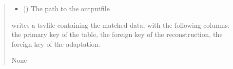 \documentclass[letterpaper,10pt,english]{sphinxmanual}
\begin{document}
\begin{fulllineitems}
\begin{quote}
\begin{description}
\begin{itemize}
\item {} 
\sphinxAtStartPar
{} () \textendash{} The path to the output\sphinxhyphen{}file

\end{itemize}

\sphinxAtStartPar
writes a tsv\sphinxhyphen{}file containing the matched data,
with the following columns:  \textendash{} the primary key of the
table,  \textendash{} the foreign key of the reconstruction,
 \textendash{} the foreign key of the adaptation.

\sphinxAtStartPar
None

\end{description}\end{quote}

\sphinxAtStartPar
{}


\end{fulllineitems}
\end{document}

